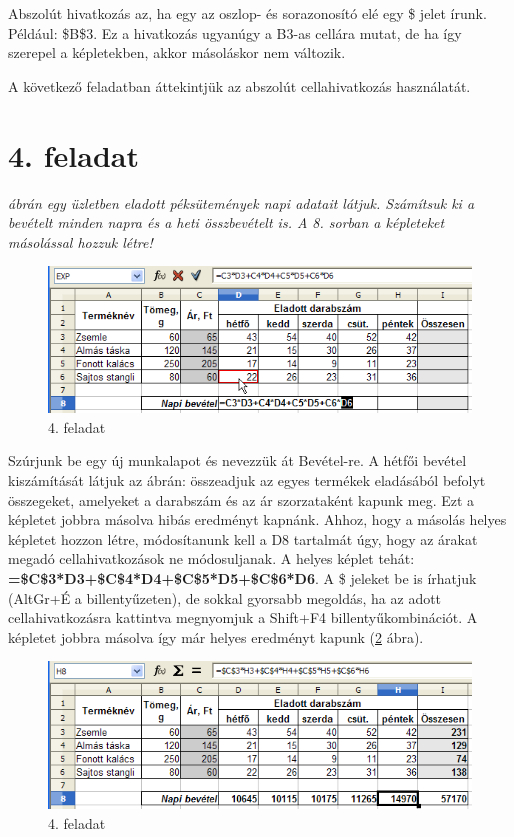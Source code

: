 Abszolút hivatkozás az, ha egy az oszlop- és sorazonosító
elé egy \$ jelet írunk. Például: \$B\$3. Ez a hivatkozás
ugyanúgy a B3-as cellára mutat, de ha így szerepel a
képletekben, akkor másoláskor nem változik.

A következő feladatban áttekintjük az abszolút
cellahivatkozás használatát.

\section{4. feladat}

{\itshape
{} ábrán egy üzletben eladott péksütemények napi adatait
látjuk. Számítsuk ki a bevételt minden napra és a heti
összbevételt is. A 8. sorban a képleteket másolással hozzuk
létre!}

\begin{figure}[!h]
\begin{center}
\includegraphics[width=15.185cm]{oocalcv1-img25.png}
\caption{4. feladat}\label{4-feladat}
\end{center}
\end{figure}

Szúrjunk be egy új munkalapot és nevezzük át Bevétel-re. A
hétfői bevétel kiszámítását látjuk az ábrán:
összeadjuk az egyes termékek eladásából befolyt összegeket,
amelyeket a darabszám és az ár szorzataként kapunk meg. Ezt a
képletet jobbra másolva hibás eredményt kapnánk. Ahhoz, hogy
a másolás helyes képletet hozzon létre, módosítanunk kell a
D8 tartalmát úgy, hogy az árakat megadó cellahivatkozások ne
módosuljanak. A helyes képlet tehát:
\textsf{\textbf{=\$C\$3*D3+\$C\$4*D4+\$C\$5*D5+\$C\$6*D6}}.
A \$ jeleket be is írhatjuk (AltGr+É a billentyűzeten), de
sokkal gyorsabb megoldás, ha az adott cellahivatkozásra kattintva
megnyomjuk a Shift+F4 billentyűkombinációt. A képletet jobbra
másolva így már helyes eredményt kapunk (\ref{4-feladat-2} ábra).

\begin{figure}[!h]
\begin{center}
\includegraphics[width=15.185cm]{oocalcv1-img26.png}
\caption{4. feladat}\label{4-feladat-2}
\end{center}
\end{figure}


